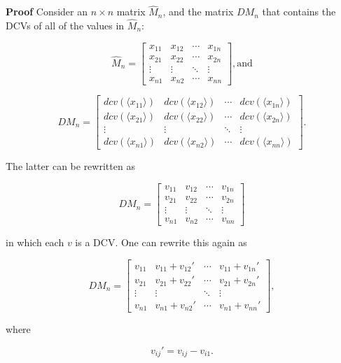 \documentclass[10pt,letterpaper]{article}
\newenvironment{proof}{\noindent\textbf{Proof} }{\qed \newline}
\newcommand{\qed}{\nobreak \ifvmode \relax \else
      \ifdim\lastskip<1.5em \hskip-\lastskip
      \hskip1.5em plus0em minus0.5em \fi \nobreak
      \vrule height0.75em width0.5em depth0.25em\fi}
\numberwithin{equation}{section}
\begin{document}
\begin{proof}Consider an $n \times n$ matrix $\hat M_n$, and the matrix
  $DM_n$ that contains the DCVs of all of the values in $\hat M_n$:

\[ \hat M_n = \left[ \begin{matrix} 
  x_{11} & x_{12} & \cdots & x_{1n} \\
  x_{21} & x_{22} & \cdots & x_{2n} \\
  \vdots & \vdots & \ddots & \vdots \\
  x_{n1} & x_{n2} & \cdots & x_{nn}
 \end{matrix} \right] , \mbox{and} \]

\[ DM_n = \left[ \begin{matrix} 
  dcv(\langle x_{11} \rangle) & dcv(\langle x_{12} \rangle) & \cdots & dcv(\langle x_{1n} \rangle) \\
  dcv(\langle x_{21} \rangle) & dcv(\langle x_{22} \rangle) & \cdots & dcv(\langle x_{2n} \rangle) \\
  \vdots & \vdots & \ddots & \vdots \\
  dcv(\langle x_{n1} \rangle) & dcv(\langle x_{n2} \rangle) & \cdots & dcv(\langle x_{nn} \rangle)
 \end{matrix} \right] . \]

The latter can be rewritten as

\[ DM_n = \left[ \begin{matrix} 
  v_{11} & v_{12} & \cdots & v_{1n} \\
  v_{21} & v_{22} & \cdots & v_{2n} \\
  \vdots & \vdots & \ddots & \vdots \\
  v_{n1} & v_{n2} & \cdots & v_{nn}
 \end{matrix} \right] \]

in which each $v$ is a DCV.  One can rewrite this again as

\[ DM_n = \left[ \begin{matrix} 
  v_{11} & v_{11} + v_{12} \prime & \cdots & v_{11} + v_{1n} \prime \\
  v_{21} & v_{21} + v_{22} \prime & \cdots & v_{21} + v_{2n} \prime \\
  \vdots & \vdots & \ddots & \vdots \\
  v_{n1} & v_{n1} + v_{n2} \prime & \cdots & v_{n1} + v_{nn} \prime
 \end{matrix} \right] , \]

where

\[ v_{ij} \prime = v_{ij} - v_{i1} . \]


\end{proof}
\end{document}
